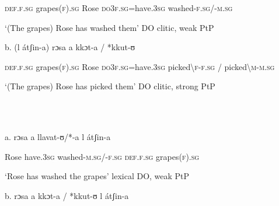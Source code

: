 \documentclass[output=paper]{langscibook}
\begin{document}
\begin{styleTabellaLUNGA}
    \textsc{def.f.sg} grapes(\textsc{f}).\textsc{sg}   Rose   \textsc{do3f.sg}=have.3\textsc{sg}   washed-\textsc{f.sg}/-\textsc{m.sg}
\end{styleTabellaLUNGA}

\begin{styleTabellaLUNGA}
    ‘(The grapes) Rose has washed them’         DO clitic, weak PtP
\end{styleTabellaLUNGA}

\begin{styleTabellaLUNGA}
  b.  (l átʃin-a)         rɔsa     a           kkɔt-a    /  *kkut-ʊ 
\end{styleTabellaLUNGA}

\begin{styleTabellaLUNGA}
    \textsc{def.f.sg} grapes(\textsc{f}).\textsc{sg}   Rose   \textsc{do3f.sg}=have.3\textsc{sg}   picked{\textbackslash}\textsc{f}{}-\textsc{f.sg}  /  picked{\textbackslash}\textsc{m-m.sg}
\end{styleTabellaLUNGA}

\begin{styleTabellaLUNGA}
    ‘(The grapes) Rose has picked them’           DO clitic, strong PtP
\end{styleTabellaLUNGA}

\begin{styleTabellaLUNGA}
\ea%
    \label{ex:key:27}
    \gll \\
         \\
    \glt
    \z %

          a.  rɔsa   a     llavat-ʊ/*-a       l       átʃin-a
\end{styleTabellaLUNGA}

\begin{styleTabellaLUNGA}
    Rose have.3\textsc{sg}   washed-\textsc{m.sg}/-\textsc{f.sg}  \textsc{def.f.sg}   grapes(\textsc{f}).\textsc{sg}
\end{styleTabellaLUNGA}

\begin{styleTabellaLUNGA}
    ‘Rose has washed the grapes’               lexical DO, weak PtP
\end{styleTabellaLUNGA}

\begin{styleTabellaLUNGA}
  b.  rɔsa   a     kkɔt-a    /  *kkut-ʊ      l     átʃin-a  
\end{styleTabellaLUNGA}
\end{document}
